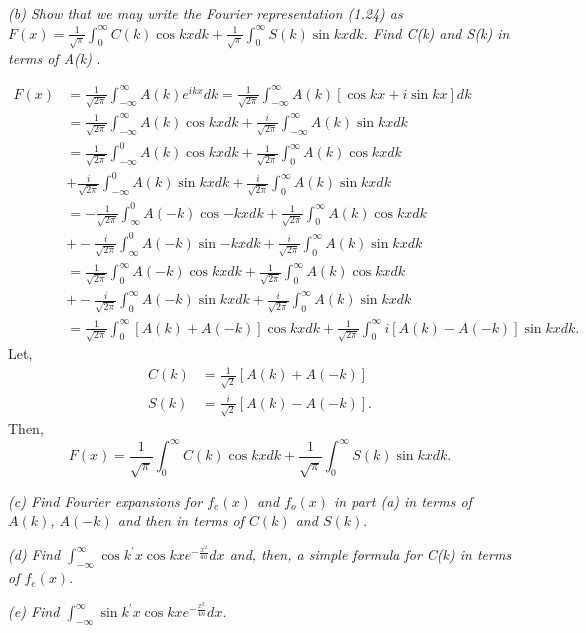\documentclass{article}
\begin{document}
\textit{(b) Show that we may write the Fourier representation (1.24) as $F(x) = \frac{1}{\sqrt{\pi}} \int_{0}^{\infty} C(k) \cos{kx} dk + \frac{1}{\sqrt{\pi}} \int_{0}^{\infty} S(k) \sin{kx} dk$. Find C(k) and S(k) in terms of A(k) }.

\begin{align*}
F(x) &= \frac{1}{\sqrt{2\pi}} \int_{-\infty}^{\infty} A(k) e^{ikx} dk = \frac{1}{\sqrt{2\pi}} \int_{-\infty}^{\infty} A(k) [\cos{kx} + i \sin{kx} ] dk \\
&= \frac{1}{\sqrt{2\pi}} \int_{-\infty}^{\infty} A(k) \cos{kx} dk + \frac{i}{\sqrt{2\pi}} \int_{-\infty}^{\infty} A(k) \sin{kx} dk\\
&= \frac{1}{\sqrt{2\pi}} \int_{-\infty}^{0} A(k) \cos{kx} dk + \frac{1}{\sqrt{2\pi}} \int_{0}^{\infty} A(k) \cos{kx} dk\\
&+ \frac{i}{\sqrt{2\pi}} \int_{-\infty}^{0} A(k) \sin{kx} dk + \frac{i}{\sqrt{2\pi}} \int_{0}^{\infty} A(k) \sin{kx} dk\\
&= -\frac{1}{\sqrt{2\pi}} \int_{\infty}^{0} A(-k) \cos{-kx} dk + \frac{1}{\sqrt{2\pi}} \int_{0}^{\infty} A(k) \cos{kx} dk\\
&+ -\frac{i}{\sqrt{2\pi}} \int_{\infty}^{0} A(-k) \sin{-kx} dk + \frac{i}{\sqrt{2\pi}} \int_{0}^{\infty} A(k) \sin{kx} dk\\
&= \frac{1}{\sqrt{2\pi}} \int_{0}^{\infty} A(-k) \cos{kx} dk + \frac{1}{\sqrt{2\pi}} \int_{0}^{\infty} A(k) \cos{kx} dk\\
&+ -\frac{i}{\sqrt{2\pi}} \int_{0}^{\infty} A(-k) \sin{kx} dk + \frac{i}{\sqrt{2\pi}} \int_{0}^{\infty} A(k) \sin{kx} dk\\
&= \frac{1}{\sqrt{2\pi}} \int_{0}^{\infty} [A(k) + A(-k)] \cos{kx} dk + \frac{1}{\sqrt{2\pi}} \int_{0}^{\infty} i [A(k) - A(-k)] \sin{kx} dk.
\end{align*}
Let,
\begin{align*}
C(k) &= \frac{1}{\sqrt{2}} [A(k) + A(-k)]\\
S(k) &= \frac{i}{\sqrt{2}} [A(k) - A(-k)].
\end{align*}
Then,
\begin{equation*}
F(x) = \frac{1}{\sqrt{\pi}} \int_{0}^{\infty} C(k) \cos{kx} dk + \frac{1}{\sqrt{\pi}} \int_{0}^{\infty} S(k) \sin{kx} dk.
\end{equation*}

\textit{(c) Find Fourier expansions for $f_{e}(x)$ and $f_{o}(x)$ in part (a) in terms of $A(k)$, $A(-k)$ and then in terms of $C(k)$ and $S(k)$}.

\textit{(d) Find $\int_{-\infty}^{\infty}\cos{k^{\prime}x}\cos{kx} e^{- \frac{x^2}{4n}} dx$ and, then, a simple formula for C(k) in terms of $f_{e}(x)$}.

\textit{(e) Find $\int_{-\infty}^{\infty}\sin{k^{\prime}x}\cos{kx} e^{- \frac{x^2}{4n}} dx$}.
\end{document}
